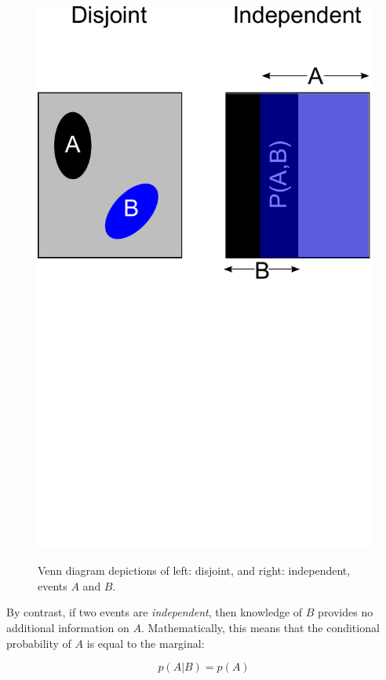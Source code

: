 \documentclass[11pt,fullpage]{book}
\begin{document}
\begin{figure}
\centering
\scalebox{0.4} 
{\includegraphics{Probability_VennIndependence.pdf}}
\caption{Venn diagram depictions of left: disjoint, and right: independent, events $A$ and $B$.}\label{fig:Probability_VennIndependence}
\end{figure}

By contrast, if two events are \textit{independent}, then knowledge of $B$ provides no additional information on $A$. Mathematically, this means that the conditional probability of $A$ is equal to the marginal:

\begin{equation}\label{eq:Probability_independentConditionalEqualMarginal}
p(A|B) = p(A)
\end{equation}
\end{document}
